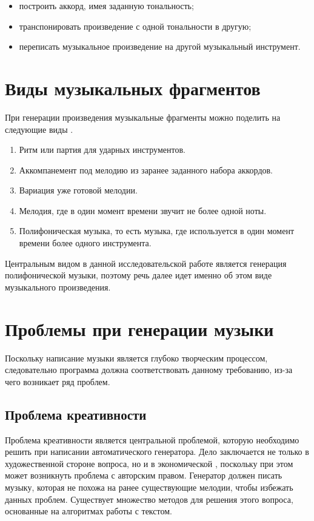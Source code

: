 \begin{itemize}
    \item построить аккорд, имея заданную тональность;
    \item транспонировать произведение с одной тональности в другую;
    \item переписать музыкальное произведение на другой музыкальный инструмент.
\end{itemize}


\section{Виды музыкальных фрагментов}

При генерации произведения музыкальные фрагменты можно поделить на следующие виды \cite{music-types}.

\begin{enumerate}
    \item Ритм или партия для ударных инструментов.
    \item Аккомпанемент под мелодию из заранее заданного набора аккордов.
    \item Вариация уже готовой мелодии.
    \item Мелодия, где в один момент времени звучит не более одной ноты.
    \item Полифоническая музыка, то есть музыка, где используется в один момент времени более одного инструмента.
\end{enumerate}

Центральным видом в данной исследовательской работе является генерация полифонической музыки, поэтому речь далее идет именно об этом виде музыкального произведения.

\section{Проблемы при генерации музыки}

Поскольку написание музыки является глубоко творческим  процессом, следовательно программа должна соответствовать данному требованию, из-за чего возникает ряд проблем.

\subsection{Проблема креативности}

Проблема креативности является центральной проблемой, которую необходимо решить при написании автоматического генератора. Дело заключается не только в художественной стороне вопроса, но и в экономической \cite{music-issues}, поскольку при этом может возникнуть проблема с авторским правом. Генератор должен писать музыку, которая не похожа на ранее существующие мелодии, чтобы избежать данных проблем. Существует множество методов для решения этого вопроса, основанные на алгоритмах работы с текстом.

